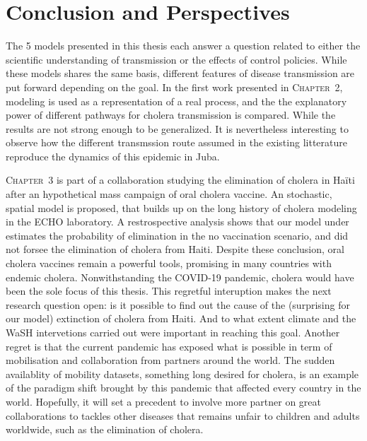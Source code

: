 \chapter*{Conclusion and Perspectives}
The 5 models presented in this thesis each answer a question related to either the scientific understanding of transmission or the effects of control policies. While these models shares the same basis, different features of disease transmission are put forward depending on the goal. 
In the first work presented in \textsc{Chapter~2}, modeling is used as a representation of a real process, and the the explanatory power of different pathways for cholera transmission is compared. While the results are not strong enough to be generalized. It is nevertheless interesting to observe how the different transmssion route assumed in the existing litterature reproduce the dynamics of this epidemic in Juba.

\textsc{Chapter~3} is part of a collaboration studying the elimination of cholera in Haïti after an hypothetical mass campaign of oral cholera vaccine. An stochastic, spatial model is proposed, that builds up on the long history of cholera modeling in the ECHO laboratory. A restrospective analysis shows that our model under estimates the probability of elimination in the no vaccination scenario, and did not forsee the elimination of cholera from Haiti. Despite these conclusion, oral cholera vaccines remain a powerful tools, promising in many countries with endemic cholera. 
Nonwithstanding the COVID-19 pandemic, cholera would have been the sole focus of this thesis. This regretful interuption makes the next research question open: is it possible to find out the cause of the (surprising for our model) extinction of cholera from Haiti. And to what extent climate and the WaSH intervetions carried out were important in reaching this goal. Another regret is that the current pandemic has exposed what is possible in term of mobilisation and collaboration from partners around the world. The sudden availablity of mobility datasets, something long desired for cholera, is an example of the paradigm shift brought by this pandemic that affected every country in the world. Hopefully, it will set a precedent to involve more partner on great collaborations to tackles other diseases that remains unfair to children and adults worldwide, such as the elimination of cholera.

